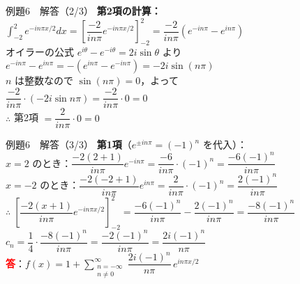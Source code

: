 \documentclass[professionalfonts]{beamer}
\begin{document}
\begin{frame}{例題6　解答（2/3）}
  \textbf{第2項の計算：}\\[4pt]
  $\displaystyle\int_{-2}^{2}e^{-in\pi x/2}dx
    = \!\left[\dfrac{-2}{in\pi}e^{-in\pi x/2}\right]_{-2}^{2}
    = \dfrac{-2}{in\pi}\!\left(e^{-in\pi}-e^{in\pi}\right)$\\[6pt]
  オイラーの公式 $e^{i\theta}-e^{-i\theta}=2i\sin\theta$ より\\[2pt]
  \hspace{2em}$e^{-in\pi}-e^{in\pi} = -(e^{in\pi}-e^{-in\pi}) = -2i\sin(n\pi)$\\[6pt]
  $n$ は整数なので $\sin(n\pi)=0$，よって\\[2pt]
  \hspace{2em}$\dfrac{-2}{in\pi}\cdot(-2i\sin n\pi) = \dfrac{-2}{in\pi}\cdot 0 = 0$\\[4pt]
  $\therefore$ 第2項 $= \dfrac{2}{in\pi}\cdot 0 = 0$
\end{frame}

\begin{frame}{例題6　解答（3/3）}
  \textbf{第1項}（$e^{\pm in\pi}=(-1)^{n}$ を代入）：\\[4pt]
  $x=2$ のとき：$\dfrac{-2(2+1)}{in\pi}e^{-in\pi} = \dfrac{-6}{in\pi}\cdot(-1)^{n} = \dfrac{-6(-1)^{n}}{in\pi}$\\[4pt]
  $x=-2$ のとき：$\dfrac{-2(-2+1)}{in\pi}e^{in\pi} = \dfrac{2}{in\pi}\cdot(-1)^{n} = \dfrac{2(-1)^{n}}{in\pi}$\\[4pt]
  $\therefore\;\!\left[\dfrac{-2(x+1)}{in\pi}e^{-in\pi x/2}\right]_{-2}^{2}
    = \dfrac{-6(-1)^{n}}{in\pi} - \dfrac{2(-1)^{n}}{in\pi}
    = \dfrac{-8(-1)^{n}}{in\pi}$\\[6pt]
  $c_{n} = \dfrac{1}{4}\cdot\dfrac{-8(-1)^{n}}{in\pi} = \dfrac{-2(-1)^{n}}{in\pi} = \dfrac{2i(-1)^{n}}{n\pi}$
  \hspace{4pt}{\footnotesize\textcolor{gray}{$-1/i=i$ を利用}}
  \\[8pt]\textcolor{red}{\textbf{答}}：$f(x) = 1 + \displaystyle\sum_{\substack{n=-\infty \\ n\neq 0}}^{\infty} \dfrac{2i(-1)^{n}}{n\pi}\,e^{in\pi x/2}$
\end{frame}
\end{document}
